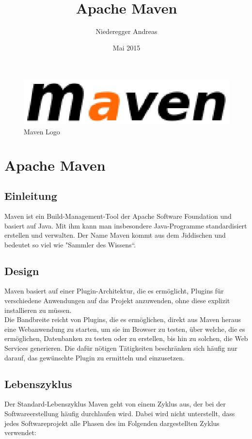 \documentclass{article}
\title{Apache Maven}
\author{Niederegger Andreas }
\date{Mai 2015}
\begin{document}
\maketitle


\begin{figure}[h]
\centering
\includegraphics{MavenLogo.eps}
\caption{Maven Logo}
\label{fig:MavenLogo}
\end{figure}
\section{Apache Maven}
\subsection{Einleitung}
Maven ist ein Build-Management-Tool der Apache Software Foundation und basiert auf Java. Mit ihm kann man insbesondere Java-Programme standardisiert erstellen und verwalten.
Der Name Maven kommt aus dem Jiddischen und bedeutet so viel wie "Sammler des Wissens“.

\subsection{Design}
Maven basiert auf einer Plugin-Architektur, die es ermöglicht, Plugins für verschiedene Anwendungen auf das Projekt anzuwenden, ohne diese explizit installieren zu müssen. 
\\Die Bandbreite reicht von Plugins, die es ermöglichen, direkt aus Maven heraus eine Webanwendung zu starten, um sie im Browser zu testen, über welche, die es ermöglichen, Datenbanken zu testen oder zu erstellen, bis hin zu solchen, die Web Services generieren. Die dafür nötigen Tätigkeiten beschränken sich häufig nur darauf, das gewünschte Plugin zu ermitteln und einzusetzen.
\newpage
\subsection{Lebenszyklus}
Der Standard-Lebenszyklus
Maven geht von einem Zyklus aus, der bei der Softwareerstellung häufig durchlaufen wird. Dabei wird nicht unterstellt, dass jedes Softwareprojekt alle Phasen des im Folgenden dargestellten Zyklus verwendet:
\end{document}
